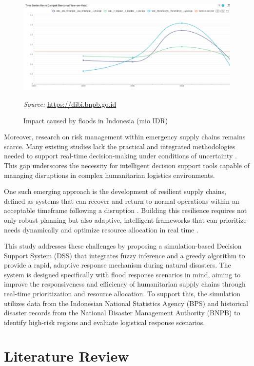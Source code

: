 \documentclass[journal,final,a4paper,twoside,11pt]{IEEEtran}
\begin{document}
\begin{figure}[htbp]
    \centerline{\includegraphics[width=0.8\linewidth]{fig3.png}}
    \caption{Impact caused by floods in Indonesia (mio IDR)}
    \label{fig:floodimpact}
    \vspace{0.2cm}
\footnotesize{\textit{Source:} \url{https://dibi.bnpb.go.id}}
\end{figure}

Moreover, research on risk management within emergency supply chains remains scarce. Many existing studies lack the practical and integrated methodologies needed to support real-time decision-making under conditions of uncertainty \cite{chukwuka2023comprehensive}. This gap underscores the necessity for intelligent decision support tools capable of managing disruptions in complex humanitarian logistics environments.

One such emerging approach is the development of resilient supply chains, defined as systems that can recover and return to normal operations within an acceptable timeframe following a disruption \cite{orengo2022food}. Building this resilience requires not only robust planning but also adaptive, intelligent frameworks that can prioritize needs dynamically and optimize resource allocation in real time \cite{ramirez2020sustainability}.

This study addresses these challenges by proposing a simulation-based Decision Support System (DSS) that integrates fuzzy inference and a greedy algorithm to provide a rapid, adaptive response mechanism during natural disasters. The system is designed specifically with flood response scenarios in mind, aiming to improve the responsiveness and efficiency of humanitarian supply chains through real-time prioritization and resource allocation. To support this, the simulation utilizes data from the Indonesian National Statistics Agency (BPS) and historical disaster records from the National Disaster Management Authority (BNPB) to identify high-risk regions and evaluate logistical response scenarios.

\section{Literature Review}
\end{document}
